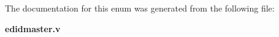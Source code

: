 \subsubsection[{bitcount}]{ {\bfseries \textcolor{vhdlchar}{ }} \hspace{0.3cm}}\label{enum1edidmaster_a3652c25e68a07a9d9de09cc07101543e}


The documentation for this enum was generated from the following file\-:\begin{DoxyCompactItemize}
\item 
{\bf edidmaster.\-v}\end{DoxyCompactItemize}
